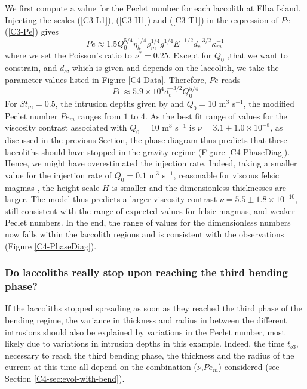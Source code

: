 We first compute  a value for the Peclet number  for each laccolith at
Elba  Island. Injecting  the scales  (\ref{C3-L1}), (\ref{C3-H1})  and
(\ref{C3-T1}) in the expression of $Pe$ (\ref{C3-Pe}) gives
\begin{equation}
  Pe \approx 1.5 Q_{0}^{5/4}\eta_{h}^{1/4}\rho_m^{1/4}g^{1/4}E^{-1/2} d_c^{-3/2} \kappa_m^{-1}
\end{equation}
where we  set the  Poisson's ratio to  $\nu^*=0.25$. Except  for $Q_0$
,that we want  to constrain, and $d_c$, which is  given and depends on
the  laccolith,  we  take  the   parameter  values  listed  in  Figure
\ref{C4-Data}.  Therefore, $Pe$ reads
\begin{equation}
  Pe \approx 5.9\times10^4 d_c^{-3/2} Q_0^{5/4}
  \label{PeExpre}
\end{equation}
For $St_m  =0.5$, the intrusion depths  given by \citet{Rocchi:2002jy}
and  $Q_0 =10$  m$^{3}$ s$^{-1}$,  the modified  Peclet number  $Pe_m$
ranges from  $1$ to  $4$.  As  the best  fit range  of values  for the
viscosity  contrast  associated  with  $Q_0=10$  m$^{3}$  s$^{-1}$  is
$\nu  = 3.1\pm  1.0  \times  10^{-8}$, as  discussed  in the  previous
Section, the phase diagram thus  predicts that these laccoliths should
have stopped in the gravity regime (Figure \ref{C4-PhaseDiag}). Hence,
we  might have  overestimated the  injection rate.   Indeed, taking  a
smaller value  for the injection  rate of $Q_0=0.1$  m$^{3}$ s$^{-1}$,
reasonable for viscous felsic magmas \citep{Harris:2000jd}, the height
scale $H$  is smaller  and the  dimensionless thicknesses  are larger.
The    model   thus    predicts    a    larger   viscosity    contrast
$\nu=5.5\pm1.8\times  10^{-10}$, still  consistent with  the range  of
expected values for felsic magmas,  and weaker Peclet numbers.  In the
end,  the range  of values  for  the dimensionless  numbers now  falls
within the laccolith  regions and is consistent  with the observations
(Figure \ref{C4-PhaseDiag}).

\subsubsection*{Do  laccoliths really  stop  upon  reaching the  third
  bending phase?}

If the laccoliths stopped spreading as  soon as they reached the third
phase of the  bending regime, the variance in thickness  and radius in
between  the   different  intrusions  should  also   be  explained  by
variations  in the  Peclet number,  most likely  due to  variations in
intrusion  depths  in  this   example.   Indeed,  the  time  $t_{b3}$,
necessary  to reach  the third  bending phase,  the thickness  and the
radius  of the  current at  this time  all depend  on the  combination
($\nu$,$Pe_m$) considered (see Section \ref{C4-sec:evol-with-bend}).

